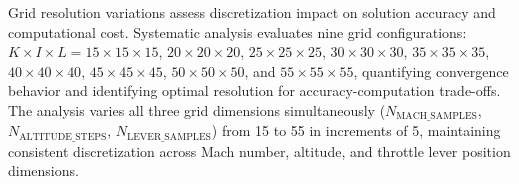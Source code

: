 Grid resolution variations assess discretization impact on solution accuracy and computational cost. Systematic analysis evaluates nine grid configurations: $K \times I \times L = 15 \times 15 \times 15$, $20 \times 20 \times 20$, $25 \times 25 \times 25$, $30 \times 30 \times 30$, $35 \times 35 \times 35$, $40 \times 40 \times 40$, $45 \times 45 \times 45$, $50 \times 50 \times 50$, and $55 \times 55 \times 55$, quantifying convergence behavior and identifying optimal resolution for accuracy-computation trade-offs. The analysis varies all three grid dimensions simultaneously ($N_{\text{MACH\_SAMPLES}}$, $N_{\text{ALTITUDE\_STEPS}}$, $N_{\text{LEVER\_SAMPLES}}$) from 15 to 55 in increments of 5, maintaining consistent discretization across Mach number, altitude, and throttle lever position dimensions.

